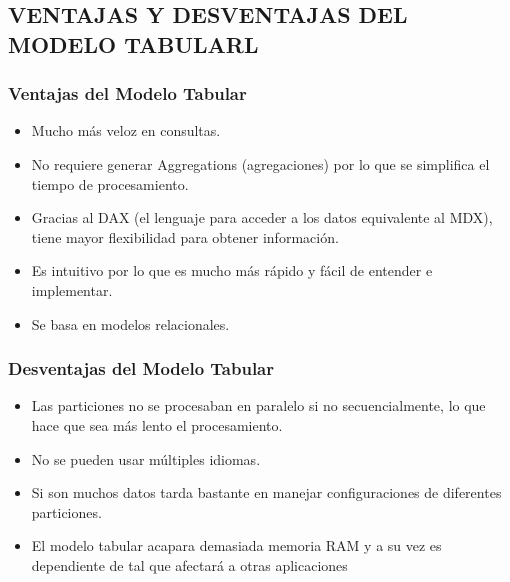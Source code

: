\documentclass[%
 reprint,
 amsmath,amssymb,
 aps,
]{revtex4-1}
\begin{document}
\subsection{VENTAJAS Y DESVENTAJAS DEL MODELO TABULARL}	
\subsubsection{Ventajas del Modelo Tabular} 
			\begin{itemize}
	 			
	 			\item Mucho más veloz en consultas.
	 			\item No requiere generar Aggregations (agregaciones) por lo que se simplifica el tiempo de procesamiento.
	 			\item Gracias al DAX (el lenguaje para acceder a los datos equivalente al MDX), tiene mayor flexibilidad para obtener información.
	 			\item Es intuitivo por lo que es mucho más rápido y fácil de entender e implementar.
	 			\item Se basa en modelos relacionales.
	 			
 			\end{itemize}
 		
\subsubsection{Desventajas del Modelo Tabular} 
			\begin{itemize}
				
				\item Las particiones no se procesaban en paralelo si no secuencialmente, lo que hace que sea más lento el procesamiento.
				\item No se pueden usar múltiples idiomas.
				\item Si son muchos datos tarda bastante en manejar configuraciones de diferentes particiones.
				\item El modelo tabular acapara demasiada memoria RAM y a su vez es dependiente de tal que afectará a otras aplicaciones
				
			\end{itemize} 	



\end{document}
